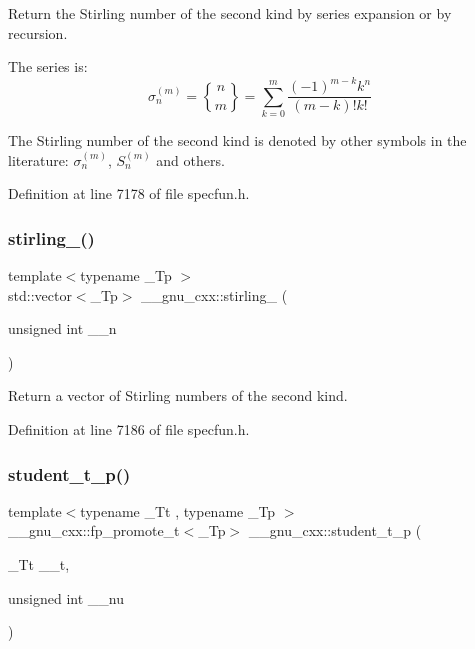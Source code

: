 Return the Stirling number of the second kind by series expansion or by recursion.

The series is\+: \[ \sigma_n^{(m)} = \genfrac{\{}{\}}{0pt}{0}{n}{m} = \sum_{k=0}^{m}\frac{(-1)^{m-k}k^n}{(m-k)!k!} \]

The Stirling number of the second kind is denoted by other symbols in the literature\+: $ \sigma_n^{(m)} $, $ \textit{S}_n^{(m)} $ and others. 

Definition at line 7178 of file specfun.\+h.

\mbox{\label{group__gnu__math__spec__func_ga6a2386b3e0940935f10a163baa925656}} 
\subsubsection{\texorpdfstring{stirling\+\_()}{stirling\_2()}\hspace{0.1cm}{\footnotesize\ttfamily [2/2]}}
{\footnotesize\ttfamily template$<$typename \+\_\+\+Tp $>$ \\
std\+::vector$<$\+\_\+\+Tp$>$ \+\_\+\+\_\+gnu\+\_\+cxx\+::stirling\+\_ (\begin{DoxyParamCaption}\item[{unsigned int}]{\+\_\+\+\_\+n }\end{DoxyParamCaption})\hspace{0.3cm}{\ttfamily [inline]}}

Return a vector of Stirling numbers of the second kind. 

Definition at line 7186 of file specfun.\+h.

\mbox{\label{group__gnu__math__spec__func_ga5a84386b009ac57a726d5d0314fdf7ce}} 
\subsubsection{\texorpdfstring{student\+\_\+t\+\_\+p()}{student\_t\_p()}}
{\footnotesize\ttfamily template$<$typename \+\_\+\+Tt , typename \+\_\+\+Tp $>$ \\
\+\_\+\+\_\+gnu\+\_\+cxx\+::fp\+\_\+promote\+\_\+t$<$\+\_\+\+Tp$>$ \+\_\+\+\_\+gnu\+\_\+cxx\+::student\+\_\+t\+\_\+p (\begin{DoxyParamCaption}\item[{\+\_\+\+Tt}]{\+\_\+\+\_\+t,  }\item[{unsigned int}]{\+\_\+\+\_\+nu }\end{DoxyParamCaption})}



